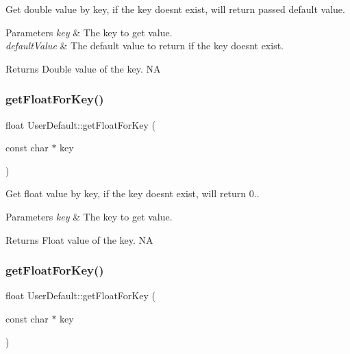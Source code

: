 Get double value by key, if the key doesn\textquotesingle{}t exist, will return passed default value. 
\begin{DoxyParams}{Parameters}
{\em key} & The key to get value. \\
\hline
{\em default\+Value} & The default value to return if the key doesn\textquotesingle{}t exist. \\
\hline
\end{DoxyParams}
\begin{DoxyReturn}{Returns}
Double value of the key.  NA 
\end{DoxyReturn}
\mbox{\label{classUserDefault_a04582157f27ec75bbc9a8abaf9c709a9}} 
\subsubsection{\texorpdfstring{get\+Float\+For\+Key()}{getFloatForKey()}\hspace{0.1cm}{\footnotesize\ttfamily [1/4]}}
{\footnotesize\ttfamily float User\+Default\+::get\+Float\+For\+Key (\begin{DoxyParamCaption}\item[{const char $\ast$}]{key }\end{DoxyParamCaption})}

Get float value by key, if the key doesn\textquotesingle{}t exist, will return 0.. 
\begin{DoxyParams}{Parameters}
{\em key} & The key to get value. \\
\hline
\end{DoxyParams}
\begin{DoxyReturn}{Returns}
Float value of the key.  NA 
\end{DoxyReturn}
\mbox{\label{classUserDefault_a04582157f27ec75bbc9a8abaf9c709a9}} 
\subsubsection{\texorpdfstring{get\+Float\+For\+Key()}{getFloatForKey()}\hspace{0.1cm}{\footnotesize\ttfamily [2/4]}}
{\footnotesize\ttfamily float User\+Default\+::get\+Float\+For\+Key (\begin{DoxyParamCaption}\item[{const char $\ast$}]{key }\end{DoxyParamCaption})}

